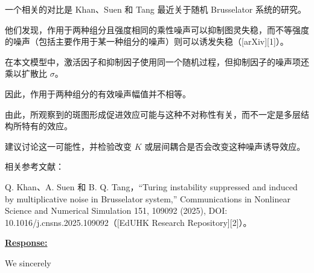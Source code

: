 \documentclass[a4paper,12pt]{article}
\newcommand{\zhtranslation}[1]{%
    \par\smallskip\noindent
    {\small\color{blue!60!black}#1}\par
}
\begin{document}
\begin{tcolorbox}[title = {Comment 2 Relation between multiplicative noise and the multilayer structure},fonttitle = \bfseries]
    \zhtranslation{一个相关的对比是 Khan、Suen 和 Tang 最近关于随机 Brusselator 系统的研究。}
    \zhtranslation{他们发现，作用于两种组分且强度相同的乘性噪声可以抑制图灵失稳，而不等强度的噪声（包括主要作用于某一种组分的噪声）则可以诱发失稳（[arXiv][1]）。}
    \zhtranslation{在本文模型中，激活因子和抑制因子使用同一个随机过程，但抑制因子的噪声项还乘以扩散比 $\sigma$。}
    \zhtranslation{因此，作用于两种组分的有效噪声幅值并不相等。}
    \zhtranslation{由此，所观察到的斑图形成促进效应可能与这种不对称性有关，而不一定是多层结构所特有的效应。}
    \zhtranslation{建议讨论这一可能性，并检验改变 $K$ 或层间耦合是否会改变这种噪声诱导效应。}

    \zhtranslation{相关参考文献：}
    \zhtranslation{Q. Khan、A. Suen 和 B. Q. Tang，“Turing instability suppressed and induced by multiplicative noise in Brusselator system,” Communications in Nonlinear Science and Numerical Simulation 151, 109092 (2025), DOI: 10.1016/j.cnsns.2025.109092（[EdUHK Research Repository][2]）。}
\end{tcolorbox}

\noindent \underline {\textbf{Response:}}
\bigskip

We sincerely

\end{document}

